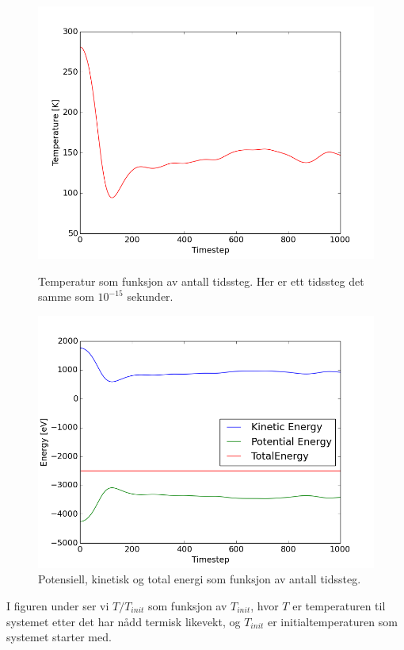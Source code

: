 \documentclass[paper=a4, fontsize=11pt]{scrartcl} %
\numberwithin{equation}{section} %
\numberwithin{figure}{section} %
\numberwithin{table}{section} %
\begin{document}
 \FloatBarrier
\begin{figure}[!htb]
\centering
{}
  \includegraphics[width=\linewidth]{TvsStep.png}
  \caption{Temperatur som funksjon av antall tidssteg. Her er ett tidssteg det samme som $10^{-15}$ sekunder. }\label{TEMP}
\endminipage\hfill
{}
  \includegraphics[width=\linewidth]{EvsStep.png}
  \caption{Potensiell, kinetisk og total energi som funksjon av antall tidssteg.}\label{Energy}
\endminipage\hfill
\end{figure}
 \FloatBarrier
 
I figuren under ser vi $T/T_{init}$ som funksjon av $T_{init}$, hvor $T$ er temperaturen til systemet etter det har nådd termisk likevekt, og $T_{init}$ er initialtemperaturen som systemet starter med.
\end{document}
